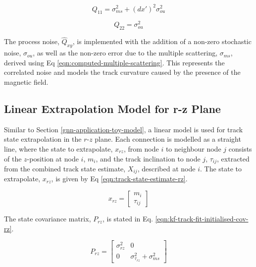 \begin{equation}
Q_{11} = \sigma_{ms}^2 + (dx')^{2} \sigma_{ou}^{2}
\label{eqn:q22}
\end{equation}

\begin{equation}
Q_{22} = \sigma_{ou}^2
\label{eqn:q22}
\end{equation}

The process noise, $\hat{Q}_{xy}$, is implemented with the addition of a non-zero stochastic noise, $\sigma_{ou}$, as well as the non-zero error due to the multiple scattering, $\sigma_{ms}$, derived using Eq \eqref{eqn:computed-multiple-scattering}. This represents the correlated noise and models the track curvature caused by the presence of the magnetic field.














\clearpage
\subsection{Linear Extrapolation Model for r-z Plane}
\label{chapter-6-r-z-plane-impl}


Similar to Section \ref{gnn-application-toy-model}, a linear model is used for track state extrapolation in the $r$-$z$ plane. Each connection is modelled as a straight line, where the state to extrapolate, $x_{rz}$, from node $i$ to neighbour node $j$ consists of the $z$-position at node $i$, $m_i$, and the track inclination to node $j$, $\tau_{ij}$, extracted from the combined track state estimate, $X_{ij}$, described at node $i$. The state to extrapolate, $x_{rz}$, is given by Eq \eqref{eqn:track-state-estimate-rz}.

\begin{equation}
x_{rz} = \begin{bmatrix} m_i \\ \tau_{ij} \end{bmatrix}
\label{eqn:track-state-estimate-rz}
\end{equation}


The state covariance matrix, $P_{rz}$, is stated in Eq. \eqref{eqn:kf-track-fit-initialised-cov-rz}.  

\begin{equation}
P_{rz} = \begin{bmatrix} \sigma_{rz}^2 & 0 \\ 0 & \sigma_{\tau_{rz}}^2 + \sigma_{ms}^2 \end{bmatrix} 
\label{eqn:kf-track-fit-initialised-cov-rz}
\end{equation}


